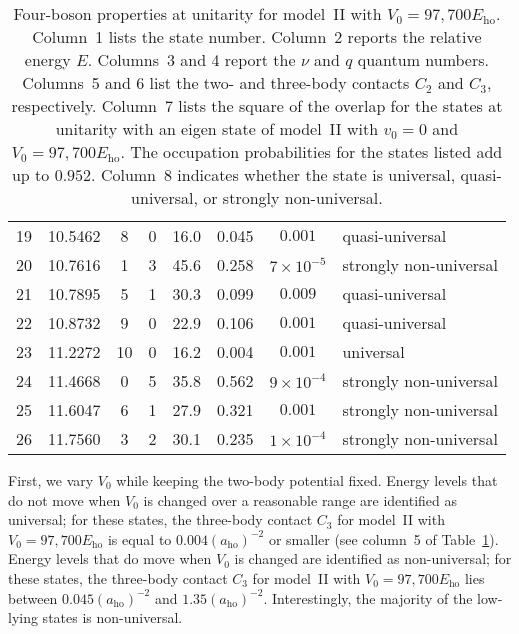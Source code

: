 \documentclass[aps,pra,twocolumn,showpacs,superscriptaddress]{revtex4}
\begin{document}
\begin{widetext}
\begin{table}
\begin{center}
\begin{tabular}{c|c|c|c|c|c| c|l}
    19  & 10.5462 & 8 & 0 & 16.0 & 0.045 & $0.001$ &  quasi-universal \\
    20  & 10.7616 & 1 & 3 & 45.6 & 0.258 & $7 \times 10^{-5}$ & strongly non-universal \\
    21  & 10.7895 & 5 & 1 & 30.3 & 0.099 & $0.009$ &  quasi-universal \\
    22  & 10.8732 & 9 & 0 & 22.9 & 0.106 & $0.001$ &  quasi-universal \\
    23  & 11.2272 & 10 & 0 & 16.2 & 0.004 & $0.001$ & universal \\
    24  & 11.4668 & 0 & 5 & 35.8 & 0.562 & $9 \times 10^{-4}$ & strongly non-universal \\
    25  & 11.6047 & 6 & 1 & 27.9 & 0.321 & $0.001$ & strongly non-universal \\
    26  & 11.7560  & 3 & 2 & 30.1 & 0.235 & $1 \times 10^{-4}$ & strongly non-universal \\
  \end{tabular}
  \caption{Four-boson properties at unitarity for model~II
with $V_0=97,700 E_{\text{ho}}$.
    Column~1 lists the state number.
    Column~2 reports
    the relative energy $E$.
    Columns~3 and 4 report the $\nu$ and $q$
    quantum numbers.
Columns~5 and 6 list the two- and three-body contacts $C_2$ and $C_3$,
respectively.
    Column~7 lists the square of the overlap for
    the states at unitarity with an eigen state
of model~II with $v_0=0$ and $V_0=97,700 E_{\text{ho}}$.
    The occupation probabilities for the states
listed add up to
    $0.952$.
Column~8 indicates whether the state is universal,
quasi-universal, or strongly non-universal.}
\label{tab_n4}
  \end{center}
  \end{table}

\end{widetext}

First, we vary $V_0$ while keeping the two-body potential fixed.
Energy levels that do not
move when $V_0$ is changed over a reasonable range are identified
as universal; for these states, the three-body contact
$C_3$ for model~II with $V_0 =97,700 E_{\text{ho}}$
is equal to $0.004 (a_{\text{ho}})^{-2}$ or
smaller (see column~5 of Table~\ref{tab_n4}).
Energy levels that do 
move when $V_0$ is changed are identified
as non-universal; for these states,
the three-body contact
$C_3$ for model~II with $V_0 =97,700 E_{\text{ho}}$
lies between $0.045 (a_{\text{ho}})^{-2}$ and $1.35 (a_{\text{ho}})^{-2}$.
Interestingly, the majority of the low-lying states is 
non-universal.
\end{document}
